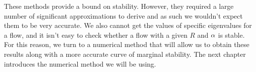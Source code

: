 These methods provide a bound on stability. However, they required a large number of significant approximations to derive and as such we wouldn't expect them to be very accurate. We also cannot get the values of specific eigenvalues for a flow, and it isn't easy to check whether a flow with a given $ R $ and $ \alpha$ is stable. For this reason, we turn to a numerical method that will allow us to obtain these results along with a more accurate curve of marginal stability. The next chapter introduces the numerical method we will be using.






